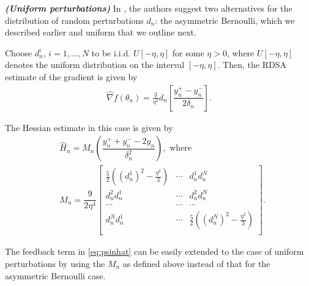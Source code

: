 \begin{remark}\textbf{\textit{(Uniform perturbations)}}
\label{remark:unif}
In \cite{prashanth2015rdsa}, the authors suggest two alternatives for the distribution of random perturbations $d_n$: the asymmetric Bernoulli, which we described earlier and uniform that we outline next.

Choose $d_n^i$, $ i=1,\ldots,N$ to be i.i.d. $U[-\eta,\eta]$ for some $\eta>0$, where $U[-\eta,\eta]$ denotes the uniform distribution on the interval $[-\eta,\eta]$.
Then, the RDSA estimate of the gradient is given by
\begin{align}
\label{eq:grad-unif}
\widehat\nabla f(\theta_n) = \frac3{\eta^2} d_n \left[ \dfrac{y_n^+ - y_n^-}{2\delta_n}\right].
\end{align}

The Hessian estimate in this case is given by
\begin{align}
\label{eq:2rdsa-estimate-unif}
&\widehat H_n =  M_n \left(\dfrac{y_n^+ + y_n^- - 2 y_n}{\delta_n^2}\right), \text{ where } \\
& M_n =
\dfrac{9}{2\eta^4}\left[
\begin{array}{cccc}
\frac{5}{2}\left((d_n^1)^2-\frac{\eta^2}{3}\right) & \cdots & d_n^1 d_n^N\\
d_n^2 d_n^1  &  \cdots & d_n^2 d_n^N\\
\cdots&\cdots&\cdots\\
d_n^N d_n^1 & \cdots &  \frac{5}{2}\left((d_n^N)^2-\frac{\eta^2}{3}\right) \\
\end{array}
\right].\nonumber
\end{align}

The feedback term in \eqref{eq:psinhat} can be easily extended to the case of uniform perturbations by using the $M_n$ as defined above instead of that for the asymmetric Bernoulli case.
\end{remark}


